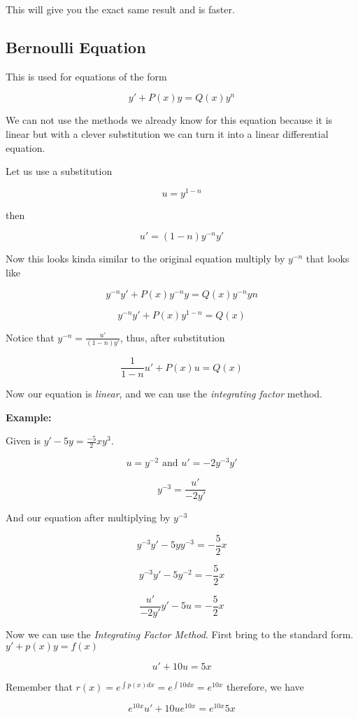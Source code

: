 This will give you the exact same result and is faster.

\subsection{Bernoulli Equation}

This is used for equations of the form 

\[
    y' + P(x)y = Q(x)y^n
\]

We can not use the methods we already know for this equation because it is linear but with a
clever substitution we can turn it into a linear differential equation.

Let us use a substitution 

\[
    u = y^{1 - n}
\] 

then 

\[
    u' = (1 - n)y^{-n} y'
\] 

Now this 
looks kinda similar to the original equation multiply by \(y^{-n}\) that looks like

\[
    y^{-n}y' + P(x)y^{-n}y = Q(x)y^{-n}y{n}
\]

\[
    y^{-n}y' + P(x)y^{1 - n} = Q(x)
\]

Notice that \(y^{-n} = \frac{u'}{(1-n)y'}\), thus, after substitution

\[
    \frac{1}{1 - n}u' + P(x)u = Q(x)
\]

Now our equation is \emph{linear}, and we can use the \emph{integrating factor} method.

\textbf{Example: }

Given is \(y' -5y = \frac{-5}{2}xy^3\).

\[
    u = y^{-2}  \text{ and } u' = -2y^{-3}y'
\]

\[
    y^{-3} = \frac{u'}{-2y'}
\]

And our equation after multiplying by \(y^{-3}\)

\[
    y^{-3}y' - 5yy^{-3} = -\frac{5}{2}x 
\]

\[
    y^{-3}y' - 5y^{-2} = -\frac{5}{2}x 
\]

\[
    \frac{u'}{-2y'}y' - 5u = -\frac{5}{2}x 
\]

Now we can use the \emph{Integrating Factor Method}. First bring to the standard form.
\(y' + p(x)y = f(x)\)

\[
  u' + 10u = 5x 
\]

Remember that \(r(x) = e^{\int p(x)dx} = e^{\int 10 dx} = e^{10x}\) therefore, we have

\[
    e^{10x}u' + 10ue^{10x} = e^{10x}5x
\]

